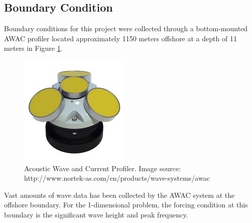 \subsection{Boundary Condition}
\label{BC}

	Boundary conditions for this project were collected through a bottom-mounted AWAC profiler located approximately 1150 meters offshore at a depth of 11 meters in Figure \ref{AWAC}.

	\begin{figure}[H]%
		\centering
		\includegraphics[width=.20\linewidth]{img/AWAC.jpg}
		\caption{Acoustic Wave and Current Profiler. 
		Image source: http://www.nortek-as.com/en/products/wave-systems/awac}
		\label{AWAC}
	\end{figure}
	
	Vast amounts of wave data has been collected by the AWAC system at the offshore boundary. For the 1-dimensional problem, the forcing condition at this boundary is the significant wave height and peak frequency.